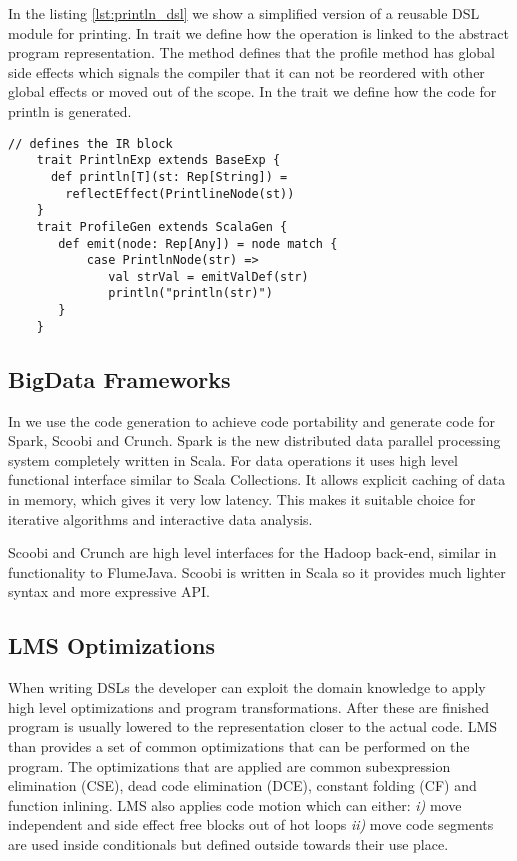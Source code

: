 In the listing \ref{lst:println_dsl} we show a simplified version of a reusable DSL module for printing. In trait  we define how the  operation is linked to the abstract program representation. The  method defines that the profile method has global side effects which signals the compiler that it can not be reordered with other global effects or moved out of the scope. In the  trait we define how the code for println is generated. 

\begin{lstlisting}[name=code, caption=Example of how the DSL module is specified. Example module is used for profiling a block of code and it can be reused in any other Scala backed DSL. \scode{Rep} types., captionpos=b, label=lst:println_dsl, float=t]
    // defines the IR block
    trait PrintlnExp extends BaseExp {
      def println[T](st: Rep[String]) =
        reflectEffect(PrintlineNode(st)) 
    }
    trait ProfileGen extends ScalaGen {
       def emit(node: Rep[Any]) = node match {
           case PrintlnNode(str) =>
              val strVal = emitValDef(str)  
              println("println(str)")
       }
    }
\end{lstlisting}

\subsection{BigData Frameworks}
In \tool we use the code generation to achieve code portability and generate code for Spark, Scoobi and Crunch. Spark is the new distributed data parallel processing system completely written in Scala. For data operations it uses high level functional interface similar to Scala Collections. It allows explicit caching of data in memory, which gives it very low latency. This makes it suitable choice for iterative algorithms and interactive data analysis. 

Scoobi and Crunch are high level interfaces for the Hadoop back-end, similar in functionality to FlumeJava. Scoobi is written in Scala so it provides much lighter syntax and more expressive API.

\subsection{LMS Optimizations}
\label{sbusec:lms-optimizations}
When writing DSLs the developer can exploit the domain knowledge to apply high level optimizations and program transformations. After these are finished program is usually lowered to the representation closer to the actual code. LMS than provides a set of common optimizations that can be performed on the program. The optimizations that are applied are common subexpression elimination (CSE), dead code elimination (DCE), constant folding (CF) and function inlining. LMS also applies code motion which can either: \emph{i)} move independent and side effect free blocks out of hot loops \emph{ii)} move code segments are used inside conditionals but defined outside towards their use place.   

